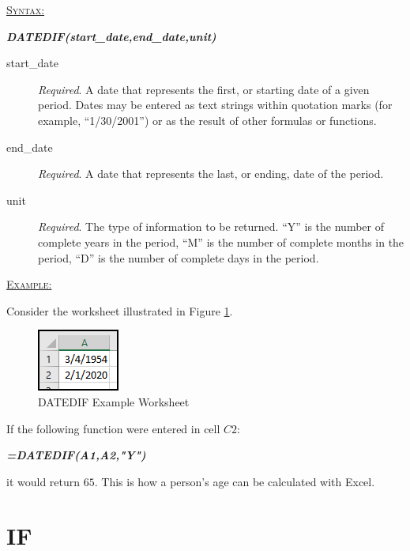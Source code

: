 \begin{addmargin}[1cm]{0cm}

	\medskip
	\underline{\textsc{Syntax:}}
	\medskip

	{\color{Syntax}
		\noindent\textbf{\textit{DATEDIF(start\_date,end\_date,unit)}}
	}
	
	\begin{description}
		\item[start\_date] \textit{Required}. A date that represents the first, or starting date of a given period. Dates may be entered as text strings within quotation marks (for example, ``1/30/2001'') or as the result of other formulas or functions.
		\item[end\_date] \textit{Required}. A date that represents the last, or ending, date of the period.
		\item[unit] \textit{Required}. The type of information to be returned. ``Y'' is the number of complete years in the period, ``M'' is the number of complete months in the period, ``D'' is the number of complete days in the period. 
	\end{description}

	\medskip
	\noindent\underline{\textsc{Example:}}
	\medskip
	
	\noindent Consider the worksheet illustrated in Figure \ref{apa:ddf}.
	
	\begin{figure}[H]
		\centering
		\includegraphics[width=\maxwidth{.25\linewidth}]{gfx/apa_fig02}
		\caption{DATEDIF Example Worksheet}
		\label{apa:ddf}
	\end{figure}
	
	\noindent If the following function were entered in cell $ C2 $:
	
	{\color{Syntax}
		\textit{\textbf{=DATEDIF(A1,A2,"Y")}}
	}
	
	\noindent it would return $ 65 $. This is how a person's age can be calculated with Excel.

\end{addmargin}

\section{IF}

